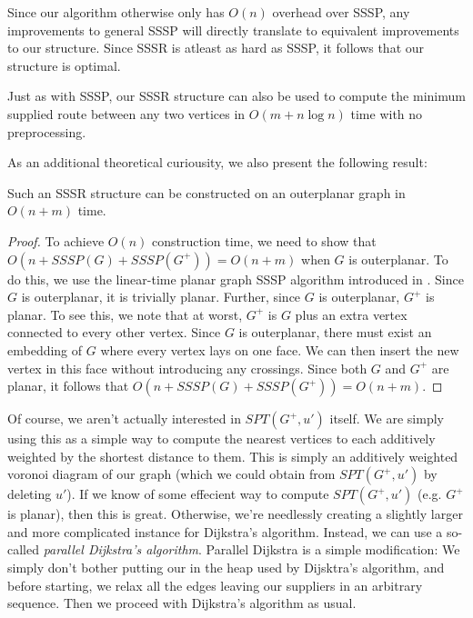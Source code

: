\documentclass{cccg13}
\begin{document}
Since our algorithm otherwise only has $O(n)$ overhead over SSSP, any improvements to general SSSP will directly translate to equivalent improvements to our structure. Since SSSR is atleast as hard as SSSP, it follows that our structure is optimal.

Just as with SSSP, our SSSR structure can also be used to compute the minimum supplied route between any two vertices in $O(m + n\log n)$ time with no preprocessing.

As an additional theoretical curiousity, we also present the following result: 

\begin{cor}
    Such an SSSR structure can be constructed on an outerplanar graph in $O(n + m)$ time.
\end{cor}

\begin{proof}
    To achieve $O(n)$ construction time, we need to show that $O(n + SSSP(G) + SSSP(G^+)) = O(n+m)$ when $G$ is outerplanar. To do this, we use the linear-time planar graph SSSP algorithm introduced in \cite{Henzinger1997}. Since $G$ is outerplanar, it is trivially planar. Further, since $G$ is outerplanar, $G^+$ is planar. To see this, we note that at worst, $G^+$ is $G$ plus an extra vertex connected to every other vertex. Since $G$ is outerplanar, there must exist an embedding of $G$ where every vertex lays on one face. We can then insert the new vertex in this face without introducing any crossings. Since both $G$ and $G^+$ are planar, it follows that $O(n + SSSP(G) + SSSP(G^+)) = O(n+m)$.
\end{proof}

Of course, we aren't actually interested in $SPT(G^+, u')$ itself. We are simply using this as a simple way to compute the nearest vertices to each \supplier additively weighted by the shortest distance to them. This is simply an additively weighted voronoi diagram of our graph (which we could obtain from $SPT(G^+, u')$ by deleting $u'$). If we know of some effecient way to compute $SPT(G^+, u')$ (e.g. $G^+$ is planar), then this is great. Otherwise, we're needlessly creating a slightly larger and more complicated instance for Dijkstra's algorithm. Instead, we can use a so-called \emph{parallel Dijkstra's algorithm}. Parallel Dijkstra is a simple modification: We simply don't bother putting our \suppliers in the heap used by Dijsktra's algorithm, and before starting, we relax all the edges leaving our suppliers in an arbitrary sequence. Then we proceed with Dijkstra's algorithm as usual.
\end{document}
